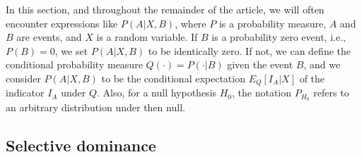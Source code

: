 \documentclass{article}
\begin{document}
In this section, and throughout the remainder of the article, we will often encounter expressions like $P(A|X, B)$, where $P$ is a probability measure, $A$ and $B$ are events, and $X$ is a random variable. If $B$ is a probability zero event, i.e., $P(B) = 0$, we set $P(A|X, B)$ to be identically zero. If not, we can define the conditional probability measure $Q(\cdot) = P(\cdot| B)$ given the event $B$, and we consider $P(A | X, B)$ to be the conditional expectation $E_Q[I_A| X]$ of the indicator $I_A$ under $Q$. Also, for a null hypothesis $H_0$, the notation $P_{H_0}$ refers to an arbitrary distribution under then null. %

\subsection{Selective dominance}
\end{document}
